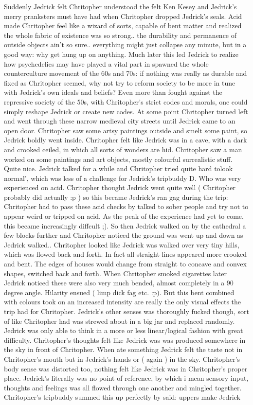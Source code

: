 \documentclass[12pt]{book}
\begin{document}
Suddenly Jedrick felt Chritopher understood the felt Ken Kesey and Jedrick's merry pranksters must have had when Chritopher dropped Jedrick's seals. Acid made Chritopher feel like a wizard of sorts, capable of bent matter and realized the whole fabric of existence was so strong.. the durability and permanence of outside objects ain't so sure.. everything might just collapse any minute, but in a good way: why get hung up on anything. Much later this led Jedrick to realize how psychedelics may have played a vital part in spawned the whole counterculture movement of the 60s and 70s: if nothing was really as durable and fixed as Chritopher seemed, why not try to reform society to be more in tune with Jedrick's own ideals and beliefs? Even more than fought against the repressive society of the 50s, with Chritopher's strict codes and morals, one could simply reshape Jedrick or create new codes. At some point Chritopher turned left and went through these narrow medieval city streets until Jedrick came to an open door. Chritopher saw some artsy paintings outside and smelt some paint, so Jedrick boldly went inside. Chritopher felt like Jedrick was in a cave, with a dark and crooked ceiled, in which all sorts of wonders are hid. Chritopher saw a man worked on some paintings and art objects, mostly colourful surrealistic stuff. Quite nice. Jedrick talked for a while and Chritopher tried quite hard tolook normal', which was less of a challenge for Jedrick's tripbuddy D. Who was very experienced on acid. Chritopher thought Jedrick went quite well ( Chritopher probably did actually :p ) so this became Jedrick's ran gag during the trip: Chritopher had to pass these acid checks by talked to sober people and try not to appear weird or tripped on acid. As the peak of the experience had yet to come, this became increasingly diffcult ;). So then Jedrick walked on by the cathedral a few blocks further and Chritopher noticed the ground was went up and down as Jedrick walked.. Chritopher looked like Jedrick was walked over very tiny hills, which was flowed back and forth. In fact all straight lines appeared more crooked and bent. The edges of houses would change from straight to concave and convex shapes, switched back and forth. When Chritopher smoked cigarettes later Jedrick noticed these were also very much bended, almost completely in a 90 degree angle. Hilarity ensued ( limp dick fag etc. :p). But this bent combined with colours took on an increased intensity are really the only visual effects the trip had for Chritopher. Jedrick's other senses was thoroughly fucked though, sort of like Chritopher had was strewed about in a big jar and replaced randomly. Jedrick was only able to think in a more or less linear/logical fashion with great difficulty. Chritopher's thoughts felt like Jedrick was was produced somewhere in the sky in front of Chritopher. When ate something Jedrick felt the taste not in Chritopher's mouth but in Jedrick's hands or ( again ) in the sky. Chritopher's body sense was distorted too, nothing felt like Jedrick was in Chritopher's proper place. Jedrick's literally was no point of reference, by which i mean sensory input, thoughts and feelings was all flowed through one another and mingled together. Chritopher's tripbuddy summed this up perfectly by said: uppers make Jedrick 
\end{document}
